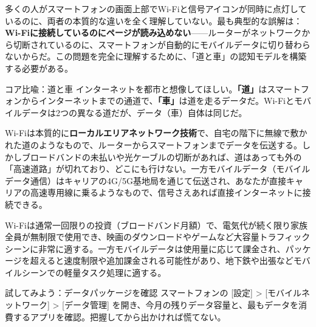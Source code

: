 


多くの人がスマートフォンの画面上部でWi-Fiと信号アイコンが同時に点灯しているのに、両者の本質的な違いを全く理解していない。最も典型的な誤解は：\textbf{Wi-Fiに接続しているのにページが読み込めない}——ルーターがネットワークから切断されているのに、スマートフォンが自動的にモバイルデータに切り替わらないからだ。この問題を完全に理解するために、「道と車」の認知モデルを構築する必要がある。

\begin{tcbinfo}{コア比喩：道と車}
インターネットを都市と想像してほしい。\textbf{「道」}はスマートフォンからインターネットまでの通道で、\textbf{「車」}は道を走るデータだ。Wi-Fiとモバイルデータは2つの異なる道だが、データ（車）自体は同じだ。

\end{tcbinfo}


Wi-Fiは本質的に\textbf{ローカルエリアネットワーク技術}で、自宅の階下に無線で敷かれた道のようなもので、ルーターからスマートフォンまでデータを伝送する。しかしブロードバンドの未払いや光ケーブルの切断があれば、道はあっても外の「高速道路」が切れており、どこにも行けない。一方モバイルデータ（モバイルデータ通信）はキャリアの4G/5G基地局を通じて伝送され、あなたが直接キャリアの高速専用線に乗るようなもので、信号さえあれば直接インターネットに接続できる。


Wi-Fiは通常一回限りの投資（ブロードバンド月額）で、電気代が続く限り家族全員が無制限で使用でき、映画のダウンロードやゲームなど大容量トラフィックシーンに非常に適する。一方モバイルデータは使用量に応じて課金され、パッケージを超えると速度制限や追加課金される可能性があり、地下鉄や出張などモバイルシーンでの軽量タスク処理に適する。

\begin{tcbpractice}{試してみよう：データパッケージを確認}
スマートフォンの [設定] > [モバイルネットワーク] > [データ管理] を開き、今月の残りデータ容量と、最もデータを消費するアプリを確認。把握してから出かければ慌てない。

\end{tcbpractice}

